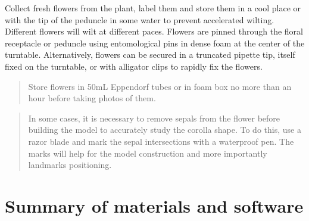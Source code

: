 \documentclass[
]{book}
\begin{document}
Collect fresh flowers from the plant, label them and store them in a
cool place or with the tip of the peduncle in some water to prevent
accelerated wilting. Different flowers will wilt at different paces.
Flowers are pinned through the floral receptacle or peduncle using
entomological pins in dense foam at the center of the turntable.
Alternatively, flowers can be secured in a truncated pipette tip, itself
fixed on the turntable, or with alligator clips to rapidly fix the
flowers.

\begin{quote}
Store flowers in 50mL Eppendorf tubes or in foam box no more than an
hour before taking photos of them.
\end{quote}

\begin{quote}
In some cases, it is necessary to remove sepals from the flower before
building the model to accurately study the corolla shape. To do this,
use a razor blade and mark the sepal intersections with a waterproof
pen. The marks will help for the model construction and more importantly
landmarks positioning.
\end{quote}

\hypertarget{summary-of-materials-and-software}{%
\section{Summary of materials and software}\label{summary-of-materials-and-software}}
\end{document}
